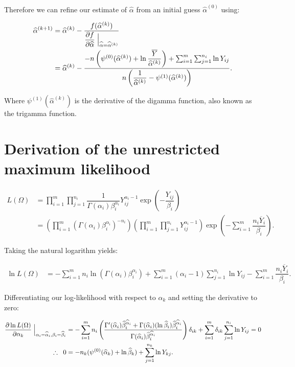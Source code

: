 \documentclass[12pt,a4paper]{article}
\newcommand{\ovY}{\overline{Y}}
\newcommand{\wal}{\widehat{\alpha}}
\newcommand{\wbe}{\widehat{\beta}}
\begin{document}
	Therefore we can refine our estimate of $\wal$ from an initial guess $\wal^{(0)}$ using:
	
	\begin{align*}
		\wal^{(k+1)} &= \wal^{(k)} - \dfrac{f(\wal^{(k)})}{\dfrac{\partial f}{\partial \wal}\Bigm\lvert_{\wal=\wal^{(k)}}} \\
		&= \wal^{(k)} - \dfrac{-n\left(\psi^{(0)}(\wal^{(k)})+\ln{\dfrac{\ovY}{\wal^{(k)}}}\right) + \sum_{i=1}^{m} \sum_{j=1}^{n_i} \ln{Y_{ij}}}{n\left(\dfrac{1}{\wal^{(k)}} - \psi^{(1)}(\wal^{(k)})\right)}.
	\end{align*}

	Where $\psi^{(1)}(\wal^{(k)})$ is the derivative of the digamma function, also known as the trigamma function.

	\section{Derivation of the unrestricted maximum likelihood}
	\begin{align}
		L(\Omega) &= \prod_{i=1}^m \prod_{j=1}^{n_i} \dfrac{1}{\Gamma(\alpha_i)\beta_i^{\alpha_i}} Y_{ij}^{\alpha_i-1} \exp{\left(-\dfrac{Y_{ij}}{\beta_i}\right)} \nonumber \\
		&= \left(\prod_{i=1}^m\left(\Gamma(\alpha_i)\beta_i^{\alpha_i}\right)^{-n_i}\right) \left(\prod_{i=1}^m \prod_{j=1}^{n_i} Y_{ij}^{\alpha_i-1}\right) \exp\left(-\sum_{i=1}^m \dfrac{n_i\ovY_i}{\beta_i}\right). \label{LikUnr}
	\end{align}

	Taking the natural logarithm yields:
	
	\begin{align*}
		\ln{L(\Omega)} &= -\sum_{i=1}^m n_i\ln{\left(\Gamma(\alpha_i)\beta_i^{\alpha_i}\right)} + \sum_{i=1}^m (\alpha_i-1)\sum_{j=1}^{n_i}\ln{Y_{ij}} - \sum_{i=1}^m \dfrac{n_i\ovY_i}{\beta_i}. 
	\end{align*}

	Differentiating our log-likelihood with respect to $\alpha_k$ and setting the derivative to zero:
	
	\begin{align}
		\dfrac{\partial \ln{L(\Omega)}}{\partial \alpha_k} \Bigm \lvert_{\alpha_i=\wal_i, \beta_i=\wbe_i} &= -\sum_{i=1}^m n_i \left(\dfrac{\Gamma'(\wal_i)\wbe_i^{\wal_i} + \Gamma(\wal_i)(\ln{\wbe_i})\wbe_i^{\wal_i}}{\Gamma(\wal_i)\wbe_i^{\wal_i}}\right)\delta_{ik} + \sum_{i=1}^m \delta_{ik} \sum_{j=1}^{n_i} \ln{Y_{ij}} =0 \nonumber\\
		\therefore \hspace{0.2cm} 0 &= -n_k(\psi^{(0)}(\wal_k)+\ln{\wbe_k}) + \sum_{j=1}^{n_k}\ln{Y_{kj}}. \label{MLEUnrAlpha}
	\end{align}
\end{document}
